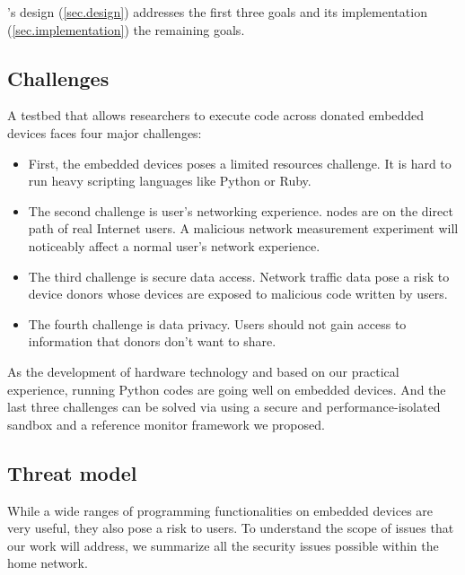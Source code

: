 \sysname's design (\ref{sec.design}) addresses the first three goals and its implementation (\ref{sec.implementation}) the remaining goals.

\subsection{Challenges}
\label{ssec.challenges}
A testbed that allows researchers to execute code across donated embedded devices faces four major challenges: 
\begin{itemize}
\item First, the embedded devices poses a limited resources challenge. It is hard to run heavy scripting languages like Python or Ruby. 
\item The second challenge is user's networking experience. \sysname nodes are on the direct path of real Internet users. A malicious network measurement experiment will noticeably affect a normal user's network experience. 
\item The third challenge is secure data access. Network traffic data pose a risk to device donors whose devices are exposed to malicious code written by users. 
\item The fourth challenge is data privacy. Users should not gain access to information that donors don't want to share.
\end{itemize}
As the development of hardware technology and based on our practical experience, running Python codes are going well on embedded devices. And the last three challenges can be solved via using a secure and performance-isolated sandbox and a reference monitor framework we proposed.

\subsection{Threat model}
\label{ssec.threat_models}
While a wide ranges of programming functionalities on embedded devices are 
very useful, they also pose a risk to users. To understand the scope of 
issues that our work will address, we summarize all the security issues 
possible within the home network.

